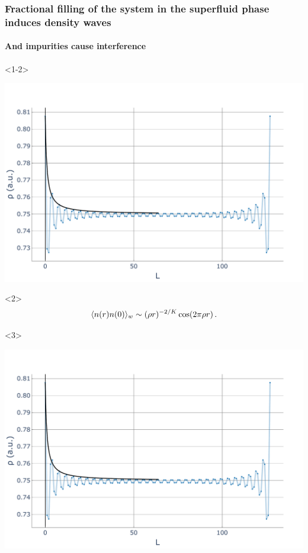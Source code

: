 \documentclass[aspectratio=169]{beamer}
\begin{document}
\begin{frame}
  \frametitle{Fractional filling of the system in the superfluid phase induces density waves}
  \framesubtitle<3>{And impurities cause interference}
  \begin{onlyenv}<1-2>
    \begin{center}
      \includegraphics[scale=0.22]{../img/Density-profiles-fractional-density.pdf}
    \end{center}
  \end{onlyenv}
  \begin{onlyenv}<2>
    \begin{equation}
      \langle n(r)n(0) \rangle_w \sim (\rho r)^{-2/K} \cos(2\pi\rho r) \thinspace .
      \label{eq:waves}
    \end{equation}
  \end{onlyenv}
  \begin{onlyenv}<3>
    \begin{center}
      \includegraphics[scale=0.22]{../img/Density-profiles-fractional-density.pdf}

\end{center}
\end{onlyenv}
\end{frame}
\end{document}
